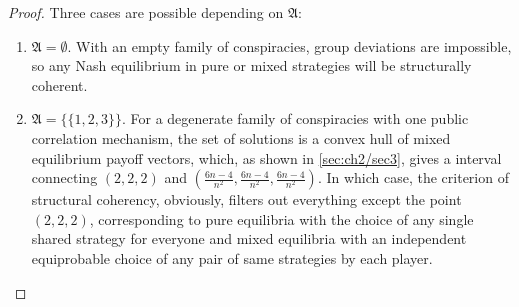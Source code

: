 \begin{proof}
	Three cases are possible depending on $\mathfrak{A}$: %
	\begin{enumerate}
		\item $\mathfrak{A} = \emptyset$. With an empty family of conspiracies, group deviations are impossible, so any Nash equilibrium in pure or mixed strategies will be structurally coherent. %
		\item $\mathfrak{A} = \{\{1, 2, 3\}\}$. For a degenerate family of conspiracies with one public correlation mechanism, the set of solutions is a convex hull of mixed equilibrium payoff vectors, which, as shown in \ref{sec:ch2/sec3}, gives a interval connecting $(2, 2, 2)$ and $(\frac{6 n - 4}{n^2}, \frac{6 n - 4}{n^2}, \frac{6 n - 4}{n^2})$. In which case, the criterion of structural coherency, obviously, filters out everything except the point $(2, 2, 2)$, corresponding to pure equilibria with the choice of any single shared strategy for everyone and mixed equilibria with an independent equiprobable choice of any pair of same strategies by each player. %

\end{enumerate}
\end{proof}
